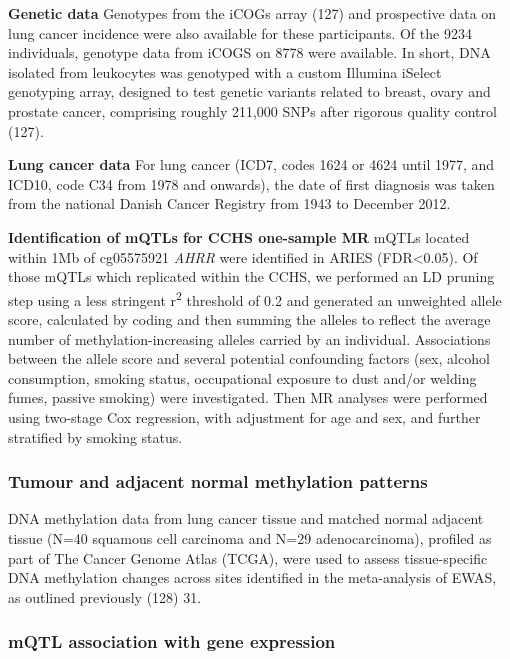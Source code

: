 \documentclass[11pt,twoside]{bristolthesis}
\begin{document}
\textbf{Genetic data}
Genotypes from the iCOGs array (127) and prospective data on lung cancer incidence were also available for these participants. Of the 9234 individuals, genotype data from iCOGS on 8778 were available. In short, DNA isolated from leukocytes was genotyped with a custom Illumina iSelect genotyping array, designed to test genetic variants related to breast, ovary and prostate cancer, comprising roughly 211,000 SNPs after rigorous quality control (127).

\textbf{Lung cancer data}
For lung cancer (ICD7, codes 1624 or 4624 until 1977, and ICD10, code C34 from 1978 and onwards), the date of first diagnosis was taken from the national Danish Cancer Registry from 1943 to December 2012.

\textbf{Identification of mQTLs for CCHS one-sample MR}
mQTLs located within 1Mb of cg05575921 \emph{AHRR} were identified in ARIES (FDR\textless0.05). Of those mQTLs which replicated within the CCHS, we performed an LD pruning step using a less stringent r\textsuperscript{2} threshold of 0.2 and generated an unweighted allele score, calculated by coding and then summing the alleles to reflect the average number of methylation-increasing alleles carried by an individual. Associations between the allele score and several potential confounding factors (sex, alcohol consumption, smoking status, occupational exposure to dust and/or welding fumes, passive smoking) were investigated. Then MR analyses were performed using two-stage Cox regression, with adjustment for age and sex, and further stratified by smoking status.

\hypertarget{tumour-and-adjacent-normal-methylation-patterns}{%
\subsubsection{Tumour and adjacent normal methylation patterns}\label{tumour-and-adjacent-normal-methylation-patterns}}

DNA methylation data from lung cancer tissue and matched normal adjacent tissue (N=40 squamous cell carcinoma and N=29 adenocarcinoma), profiled as part of The Cancer Genome Atlas (TCGA), were used to assess tissue-specific DNA methylation changes across sites identified in the meta-analysis of EWAS, as outlined previously (128) 31.

\hypertarget{mqtl-association-with-gene-expression}{%
\subsubsection{mQTL association with gene expression}\label{mqtl-association-with-gene-expression}}
\end{document}

